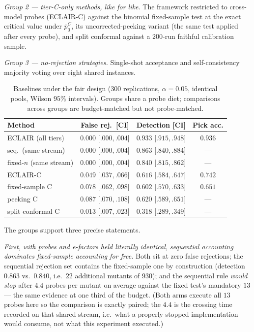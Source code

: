 \documentclass[pdflatex,sn-mathphys-num]{sn-jnl}
\theoremstyle{thmstyleone}
\theoremstyle{thmstyletwo}
\begin{document}
\emph{Group 2 --- tier-C-only methods, like for like.} The framework
restricted to cross-model probes (ECLAIR-C) against the binomial
fixed-sample test at the exact critical value under $\bar p_0^{C}$,
its uncorrected-peeking variant (the same test applied after every
probe), and split conformal against a $200$-run faithful calibration
sample.

\emph{Group 3 --- no-rejection strategies.} Single-shot acceptance
and self-consistency majority voting over eight shared instances.

\begin{table}[t]
\caption{Baselines under the fair design ($300$ replications,
$\alpha = 0.05$, identical pools, Wilson $95\%$ intervals). Groups
share a probe diet; comparisons across groups are budget-matched but
not probe-matched.}\label{tab:baselines}
\begin{tabular}{lcc c}
\toprule
Method & False rej.\ [CI] & Detection [CI] & Pick acc.\\
\midrule
ECLAIR (all tiers) & $0.000$ [$.000, .004$] & $0.933$ [$.915, .948$] & $0.936$\\
\addlinespace
seq.\ (same stream) & $0.000$ [$.000, .004$] & $0.863$ [$.840, .884$] & ---\\
fixed-$n$ (same stream) & $0.000$ [$.000, .004$] & $0.840$ [$.815, .862$] & ---\\
\addlinespace
ECLAIR-C & $0.049$ [$.037, .066$] & $0.616$ [$.584, .647$] & $0.742$\\
fixed-sample C & $0.078$ [$.062, .098$] & $0.602$ [$.570, .633$] & $0.651$\\
peeking C & $0.087$ [$.070, .108$] & $0.620$ [$.589, .651$] & ---\\
split conformal C & $0.013$ [$.007, .023$] & $0.318$ [$.289, .349$] & ---\\
\bottomrule
\end{tabular}
\end{table}

The groups support three precise statements.

\emph{First, with probes and e-factors held literally identical,
sequential accounting dominates fixed-sample accounting for free.}
Both sit at zero false rejections; the sequential rejection set
contains the fixed-sample one by construction (detection $0.863$ vs.\
$0.840$, i.e.\ $22$ additional mutants of $930$); and the sequential
rule \emph{would stop} after $4.4$ probes per mutant on average
against the fixed test's mandatory $13$ --- the same evidence at one
third of the budget. (Both arms execute all $13$ probes here so the
comparison is exactly paired; the $4.4$ is the crossing time recorded
on that shared stream, i.e.\ what a properly stopped implementation
would consume, not what this experiment executed.)
\end{document}

